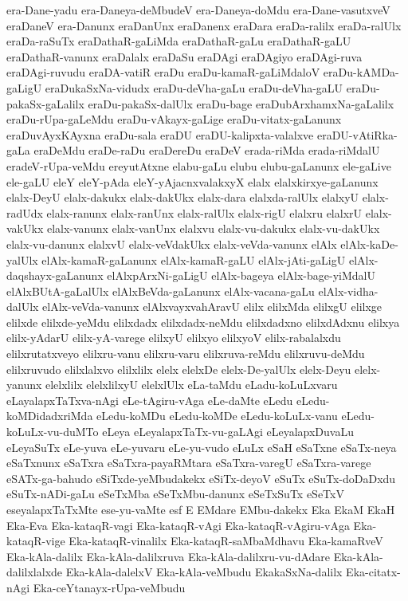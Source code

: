 {era-Dane-yadu
era-Daneya-deMbudeV
era-Daneya-doMdu
era-Dane-vasutxveV
eraDaneV
era-Danunx
eraDanUnx
eraDanenx
eraDara
eraDa-ralilx
eraDa-ralUlx
eraDa-raSuTx
eraDathaR-gaLiMda
eraDathaR-gaLu
eraDathaR-gaLU
eraDathaR-vanunx
eraDalalx
eraDaSu
eraDAgi
eraDAgiyo
eraDAgi-ruva
eraDAgi-ruvudu
eraDA-vatiR
eraDu
eraDu-kamaR-gaLiMdaloV
eraDu-kAMDa-gaLigU
eraDukaSxNa-vidudx
eraDu-deVha-gaLu
eraDu-deVha-gaLU
eraDu-pakaSx-gaLalilx
eraDu-pakaSx-dalUlx
eraDu-bage
eraDubArxhamxNa-gaLalilx
eraDu-rUpa-gaLeMdu
eraDu-vAkayx-gaLige
eraDu-vitatx-gaLanunx
eraDuvAyxKAyxna
eraDu-sala
eraDU
eraDU-kalipxta-valalxve
eraDU-vAtiRka-gaLa
eraDeMdu
eraDe-raDu
eraDereDu
eraDeV
erada-riMda
erada-riMdalU
eradeV-rUpa-veMdu
ereyutAtxne
elabu-gaLu
elubu
elubu-gaLanunx
ele-gaLive
ele-gaLU
eleY
eleY-pAda
eleY-yAjacnxvalakxyX
elalx
elalxkirxye-gaLanunx
elalx-DeyU
elalx-dakukx
elalx-dakUkx
elalx-dara
elalxda-ralUlx
elalxyU
elalx-radUdx
elalx-ranunx
elalx-ranUnx
elalx-ralUlx
elalx-rigU
elalxru
elalxrU
elalx-vakUkx
elalx-vanunx
elalx-vanUnx
elalxvu
elalx-vu-dakukx
elalx-vu-dakUkx
elalx-vu-danunx
elalxvU
elalx-veVdakUkx
elalx-veVda-vanunx
elAlx
elAlx-kaDe-yalUlx
elAlx-kamaR-gaLanunx
elAlx-kamaR-gaLU
elAlx-jAti-gaLigU
elAlx-daqshayx-gaLanunx
elAlxpArxNi-gaLigU
elAlx-bageya
elAlx-bage-yiMdalU
elAlxBUtA-gaLalUlx
elAlxBeVda-gaLanunx
elAlx-vacana-gaLu
elAlx-vidha-dalUlx
elAlx-veVda-vanunx
elAlxvayxvahAravU
elilx
elilxMda
elilxgU
elilxge
elilxde
elilxde-yeMdu
elilxdadx
elilxdadx-neMdu
elilxdadxno
elilxdAdxnu
elilxya
elilx-yAdarU
elilx-yA-varege
elilxyU
elilxyo
elilxyoV
elilx-rabalalxdu
elilxrutatxveyo
elilxru-vanu
elilxru-varu
elilxruva-reMdu
elilxruvu-deMdu
elilxruvudo
elilxlalxvo
elilxlilx
elelx
elelxDe
elelx-De-yalUlx
elelx-Deyu
elelx-yanunx
elelxlilx
elelxlilxyU
elelxlUlx
eLa-taMdu
eLadu-koLuLxvaru
eLayalapxTaTxva-nAgi
eLe-tAgiru-vAga
eLe-daMte
eLedu
eLedu-koMDidadxriMda
eLedu-koMDu
eLedu-koMDe
eLedu-koLuLx-vanu
eLedu-koLuLx-vu-duMTo
eLeya
eLeyalapxTaTx-vu-gaLAgi
eLeyalapxDuvaLu
eLeyaSuTx
eLe-yuva
eLe-yuvaru
eLe-yu-vudo
eLuLx
eSaH
eSaTxne
eSaTx-neya
eSaTxnunx
eSaTxra
eSaTxra-payaRMtara
eSaTxra-varegU
eSaTxra-varege
eSATx-ga-bahudo
eSiTxde-yeMbudakekx
eSiTx-deyoV
eSuTx
eSuTx-doDaDxdu
eSuTx-nADi-gaLu
eSeTxMba
eSeTxMbu-danunx
eSeTxSuTx
eSeTxV
eseyalapxTaTxMte
ese-yu-vaMte
esf
E
EMdare
EMbu-dakekx
Eka
EkaM
EkaH
Eka-Eva
Eka-kataqR-vagi
Eka-kataqR-vAgi
Eka-kataqR-vAgiru-vAga
Eka-kataqR-vige
Eka-kataqR-vinalilx
Eka-kataqR-saMbaMdhavu
Eka-kamaRveV
Eka-kAla-dalilx
Eka-kAla-dalilxruva
Eka-kAla-dalilxru-vu-dAdare
Eka-kAla-dalilxlalxde
Eka-kAla-dalelxV
Eka-kAla-veMbudu
EkakaSxNa-dalilx
Eka-citatx-nAgi
Eka-ceYtanayx-rUpa-veMbudu
}
